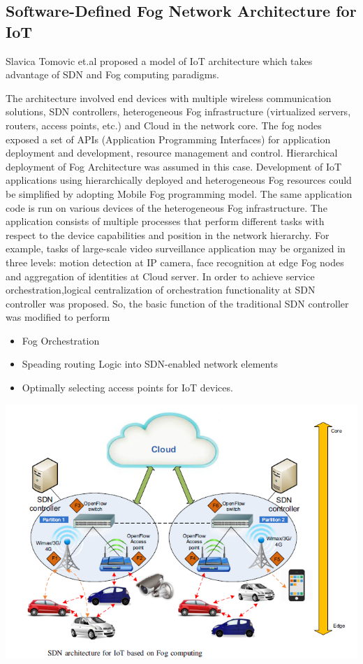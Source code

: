 \documentclass{article}
\begin{document}
\subsection{Software-Defined Fog Network Architecture for IoT}
Slavica Tomovic et.al\cite{tomovic2017software} proposed a model of IoT architecture which takes advantage of SDN and Fog computing paradigms.

The architecture involved end devices with multiple wireless communication solutions, SDN controllers, heterogeneous Fog infrastructure (virtualized servers, routers, access points, etc.) and Cloud in the network core\cite{tomovic2017software}.
The fog nodes exposed a set of APIs (Application Programming Interfaces) for application deployment and development, resource management and control. Hierarchical deployment of Fog Architecture was assumed in this case.
Development of IoT applications using hierarchically deployed and heterogeneous Fog resources could be simplified by adopting Mobile Fog programming model\cite{tomovic2017software}.
The same application code is run on various devices of the heterogeneous Fog infrastructure. The application consists of multiple processes that perform different tasks with respect to the device capabilities and position in the network hierarchy. For example, tasks of large-scale video surveillance application may be organized in three levels: motion detection at IP camera, face recognition at edge Fog nodes and aggregation of identities at Cloud server.
In order to achieve service orchestration,logical centralization of orchestration functionality at SDN controller was proposed\cite{tomovic2017software}. 
So, the basic function of the traditional SDN controller was modified to perform
\begin{itemize}
\item Fog Orchestration
\item Speading routing Logic into SDN-enabled network elements
\item Optimally selecting access points for IoT devices.
\end{itemize}  
 
\includegraphics[scale=0.8]{sdn.png}
\end{document}
